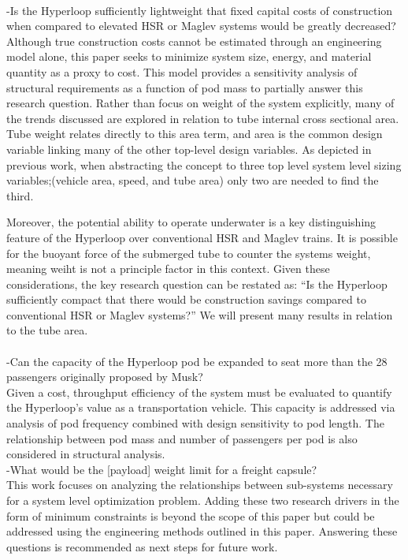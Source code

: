 	\\
	-Is the Hyperloop sufficiently lightweight that fixed capital costs of construction
	when compared to elevated HSR or Maglev systems would be greatly decreased?\\

	Although true construction costs cannot be estimated through an engineering
	model alone, this paper seeks to minimize system size, energy, and material
	quantity as a proxy to cost. This model provides a sensitivity
	analysis of structural requirements as a function of pod mass to partially
	answer this research question. Rather than focus on weight of the system explicitly,
	many of the trends discussed are explored in relation to tube internal
	cross sectional area. Tube weight relates directly to this area term, and
	area is the common design variable linking many of the other top-level
	design variables. As depicted in previous work,
	\cite{Chin} when abstracting the concept to three top level system level
	sizing variables;(vehicle area, speed, and tube area) only two are needed
	to find the third.

	Moreover, the potential ability to operate underwater is a key distinguishing feature
	of the Hyperloop over conventional HSR and Maglev trains. It is possible for the buoyant force
	of the submerged tube to counter the systems weight, meaning weiht is not a principle factor in this context.
	Given these considerations, the key research
	question can be restated as: ``Is the Hyperloop sufficiently compact that
	there would be construction savings compared to conventional
	HSR or Maglev systems?'' We will present many results in relation to the tube area.\\
	\\
	-Can the capacity of the Hyperloop pod be expanded to seat more than the 28
	passengers originally proposed by Musk?\\

	Given a cost, throughput efficiency of the system must be evaluated to quantify the
	Hyperloop's value as a transportation vehicle. This capacity is addressed
	via analysis of pod frequency combined with design sensitivity to pod length.
	The relationship between pod mass and number of passengers per pod is also considered
	in structural analysis.\\

	-What would be the [payload] weight limit for a freight capsule?\\

	This work focuses on analyzing the relationships between sub-systems
	necessary for a system level optimization problem. Adding these two research
	drivers in the form of minimum constraints is beyond the scope of this paper
	but could be addressed using the engineering methods outlined in this paper.
	Answering these questions is recommended as next steps for future work.\\

